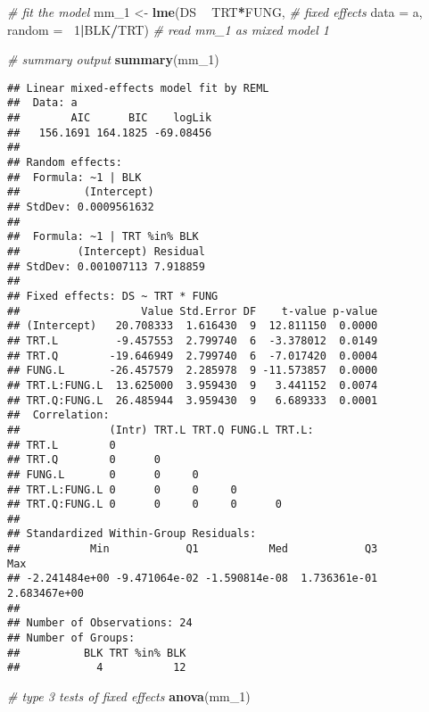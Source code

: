 \documentclass[]{book}
\newenvironment{Shaded}{\begin{snugshade}}{\end{snugshade}}
\newcommand{\CommentTok}[1]{\textcolor[rgb]{0.56,0.35,0.01}{\textit{#1}}}
\newcommand{\DataTypeTok}[1]{\textcolor[rgb]{0.13,0.29,0.53}{#1}}
\newcommand{\DecValTok}[1]{\textcolor[rgb]{0.00,0.00,0.81}{#1}}
\newcommand{\KeywordTok}[1]{\textcolor[rgb]{0.13,0.29,0.53}{\textbf{#1}}}
\newcommand{\NormalTok}[1]{#1}
\newcommand{\OperatorTok}[1]{\textcolor[rgb]{0.81,0.36,0.00}{\textbf{#1}}}
\newcommand{\StringTok}[1]{\textcolor[rgb]{0.31,0.60,0.02}{#1}}
\begin{document}
\begin{Shaded}
\begin{Highlighting}[]
\CommentTok{# fit the model  }
\NormalTok{mm_}\DecValTok{1}\NormalTok{ <-}\StringTok{ }\KeywordTok{lme}\NormalTok{(DS }\OperatorTok{~}\StringTok{ }\NormalTok{TRT}\OperatorTok{*}\NormalTok{FUNG, }\CommentTok{# fixed effects}
            \DataTypeTok{data =}\NormalTok{ a,}
            \DataTypeTok{random =} \OperatorTok{~}\DecValTok{1}\OperatorTok{|}\NormalTok{BLK}\OperatorTok{/}\NormalTok{TRT) }\CommentTok{# read mm_1 as mixed model 1}

\CommentTok{# summary output}
\KeywordTok{summary}\NormalTok{(mm_}\DecValTok{1}\NormalTok{)}
\end{Highlighting}
\end{Shaded}

\begin{verbatim}
## Linear mixed-effects model fit by REML
##  Data: a 
##        AIC      BIC    logLik
##   156.1691 164.1825 -69.08456
## 
## Random effects:
##  Formula: ~1 | BLK
##          (Intercept)
## StdDev: 0.0009561632
## 
##  Formula: ~1 | TRT %in% BLK
##         (Intercept) Residual
## StdDev: 0.001007113 7.918859
## 
## Fixed effects: DS ~ TRT * FUNG 
##                   Value Std.Error DF    t-value p-value
## (Intercept)   20.708333  1.616430  9  12.811150  0.0000
## TRT.L         -9.457553  2.799740  6  -3.378012  0.0149
## TRT.Q        -19.646949  2.799740  6  -7.017420  0.0004
## FUNG.L       -26.457579  2.285978  9 -11.573857  0.0000
## TRT.L:FUNG.L  13.625000  3.959430  9   3.441152  0.0074
## TRT.Q:FUNG.L  26.485944  3.959430  9   6.689333  0.0001
##  Correlation: 
##              (Intr) TRT.L TRT.Q FUNG.L TRT.L:
## TRT.L        0                               
## TRT.Q        0      0                        
## FUNG.L       0      0     0                  
## TRT.L:FUNG.L 0      0     0     0            
## TRT.Q:FUNG.L 0      0     0     0      0     
## 
## Standardized Within-Group Residuals:
##           Min            Q1           Med            Q3           Max 
## -2.241484e+00 -9.471064e-02 -1.590814e-08  1.736361e-01  2.683467e+00 
## 
## Number of Observations: 24
## Number of Groups: 
##          BLK TRT %in% BLK 
##            4           12
\end{verbatim}

\begin{Shaded}
\begin{Highlighting}[]
\CommentTok{# type 3 tests of fixed effects}
\KeywordTok{anova}\NormalTok{(mm_}\DecValTok{1}\NormalTok{)}
\end{Highlighting}
\end{Shaded}
\end{document}
